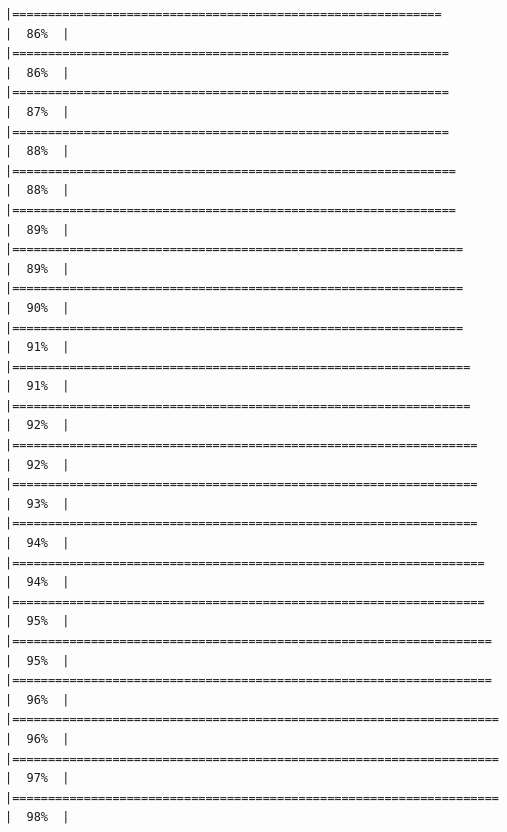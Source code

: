 \documentclass[
  bookmarksnumbered]{article}
\begin{document}
\begin{verbatim}
|============================================================          |  86%  |                                                                              |=============================================================         |  86%  |                                                                              |=============================================================         |  87%  |                                                                              |=============================================================         |  88%  |                                                                              |==============================================================        |  88%  |                                                                              |==============================================================        |  89%  |                                                                              |===============================================================       |  89%  |                                                                              |===============================================================       |  90%  |                                                                              |===============================================================       |  91%  |                                                                              |================================================================      |  91%  |                                                                              |================================================================      |  92%  |                                                                              |=================================================================     |  92%  |                                                                              |=================================================================     |  93%  |                                                                              |=================================================================     |  94%  |                                                                              |==================================================================    |  94%  |                                                                              |==================================================================    |  95%  |                                                                              |===================================================================   |  95%  |                                                                              |===================================================================   |  96%  |                                                                              |====================================================================  |  96%  |                                                                              |====================================================================  |  97%  |                                                                              |====================================================================  |  98%  |                                                                              
\end{verbatim}
\end{document}
